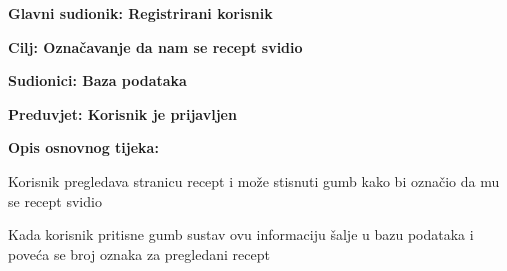 				\noindent {}
				\begin{packed_item}
					
					\item \textbf{Glavni sudionik: Registrirani korisnik}
					\item  \textbf{Cilj: Označavanje da nam se recept svidio} 
					\item  \textbf{Sudionici: Baza podataka} 
					\item  \textbf{Preduvjet: Korisnik je prijavljen} 
					\item  \textbf{Opis osnovnog tijeka:}
					
					\item[] \begin{packed_enum}
						
						\item Korisnik pregledava stranicu recept i može stisnuti gumb kako bi označio da mu se recept svidio
						\item Kada korisnik pritisne gumb sustav ovu informaciju šalje u bazu podataka i poveća se broj oznaka za pregledani recept
					\end{packed_enum}
					
					
				\end{packed_item}
				
